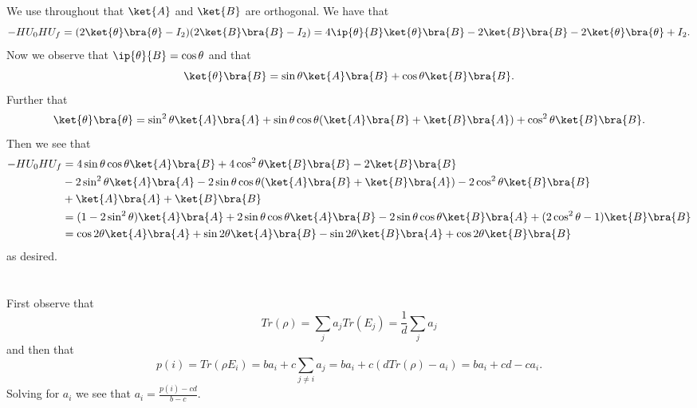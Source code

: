\documentclass[letterpaper,12pt,oneside,onecolumn]{article}
\begin{document}
\section{}
\paragraph{}
We use throughout that $\ket{A}$ and $\ket{B}$ are orthogonal. We have that
$$-HU_0HU_f = (2\ket{\theta}\bra{\theta} - I_2)(2\ket{B}\bra{B} - I_2) = 4\ip{\theta}{B}\ket{\theta}\bra{B} - 2\ket{B}\bra{B} - 2\ket{\theta}\bra{\theta} + I_2.$$
Now we observe that
$\ip{\theta}{B} = \cos\theta$ and that
$$\ket{\theta}\bra{B} = \sin\theta\ket{A}\bra{B} + \cos\theta\ket{B}\bra{B}.$$
Further that
$$\ket{\theta}\bra{\theta} = \sin^2\theta\ket{A}\bra{A} + \sin\theta\cos\theta (\ket{A}\bra{B} + \ket{B}\bra{A}) + \cos^2\theta\ket{B}\bra{B}.$$
Then we see that
\begin{align*}
-HU_0HU_f &= 4\sin\theta\cos\theta\ket{A}\bra{B} + 4\cos^2\theta\ket{B}\bra{B} -2 \ket{B}\bra{B} \\
&-2\sin^2\theta\ket{A}\bra{A} -2\sin\theta\cos\theta(\ket{A}\bra{B} + \ket{B}\bra{A}) -2\cos^2\theta\ket{B}\bra{B} \\
&+ \ket{A}\bra{A} + \ket{B}\bra{B}\\
&= (1-2\sin^2\theta)\ket{A}\bra{A} +2\sin\theta\cos\theta\ket{A}\bra{B} - 2\sin\theta\cos\theta\ket{B}\bra{A} + (2\cos^2\theta-1)\ket{B}\bra{B}\\
&= \cos2\theta \ket{A}\bra{A} + \sin2\theta\ket{A}\bra{B} -\sin2\theta\ket{B}\bra{A} +\cos2\theta\ket{B}\bra{B}
\end{align*}
as desired.
\newpage
\section{}
\paragraph{}
First observe that
$$Tr(\rho) = \sum_j a_j Tr(E_j) = \frac{1}{d} \sum_j a_j$$
and then that
$$p(i) = Tr(\rho E_i) = ba_i + c \sum_{j\neq i} a_j = ba_i + c(dTr(\rho) - a_i) = ba_i + cd - ca_i.$$
Solving for $a_i$ we see that
$a_i = \frac{p(i) -cd}{b-c}.$
\end{document}
